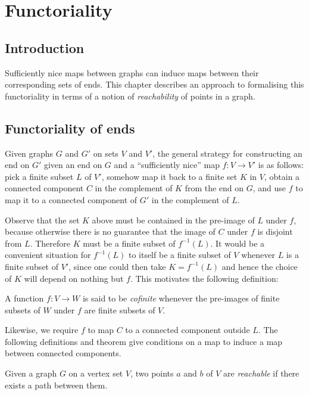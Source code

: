 \chapter{Functoriality}\label{chap:functoriality}

\section{Introduction}

Sufficiently nice maps between graphs can induce maps between their corresponding sets of ends. This chapter describes an approach to formalising this functoriality in terms of a notion of \emph{reachability} of points in a graph.

\section{Functoriality of ends}
\label{sec:ends_functoriality}

Given graphs $G$ and $G'$ on sets $V$ and $V'$, the general strategy for constructing an end on $G'$ given an end on $G$ and a ``sufficiently nice'' map $f : V \to V'$ is as follows:
pick a finite subset $L$ of $V'$, somehow map it back to a finite set $K$ in $V$, obtain a connected component $C$ in the complement of $K$ from the end on $G$, and use $f$ to map it to a connected component of $G'$ in the complement of $L$.

Observe that the set $K$ above must be contained in the pre-image of $L$ under $f$, because otherwise there is no guarantee that the image of $C$ under $f$ is disjoint from $L$. Therefore $K$ must be a finite subset of $f^{-1}(L)$. It would be a convenient situation for $f^{-1}(L)$ to itself be a finite subset of $V$ whenever $L$ is a finite subset of $V'$, since one could then take $K = f^{-1}(L)$ and hence the choice of $K$ will depend on nothing but $f$. This motivates the following definition:

\begin{definition}
  \label{def:cofinite_map}
  A function $f : V \to W$ is said to be \emph{cofinite} whenever the pre-images of finite subsets of $W$ under $f$ are finite subsets of $V$.
\end{definition}


Likewise, we require $f$ to map $C$ to a connected component outside $L$. The following definitions and theorem give conditions on a map to induce a map between connected components.

\begin{definition}
  \label{def:reachable}
  Given a graph $G$ on a vertex set $V$, two points $a$ and $b$ of $V$ are \emph{reachable} if there exists a path between them.
\end{definition}


